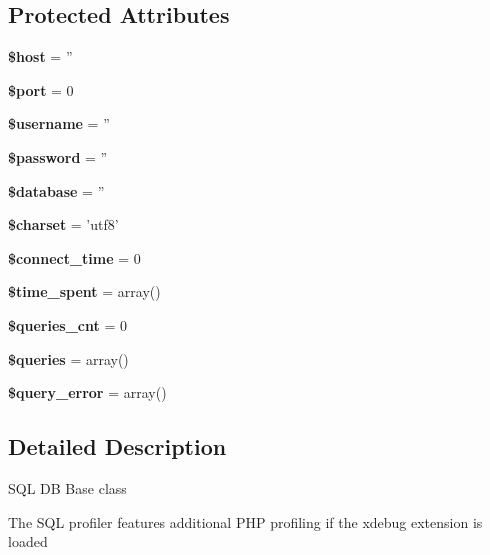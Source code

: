 \subsection*{Protected Attributes}
\begin{CompactItemize}
\item 
{\bf \$host} = ''\label{protocolDB__Base-p_ca95ca05d3a82d7cdfa7df3108f23173}

\item 
{\bf \$port} = 0\label{protocolDB__Base-p_230adeded1094a16331a2196dae7c0cb}

\item 
{\bf \$username} = ''\label{protocolDB__Base-p_a5eabff2dedadf9c88ba298817b31640}

\item 
{\bf \$password} = ''\label{protocolDB__Base-p_f5ac2728a90f6e1f674e1a709c8f1664}

\item 
{\bf \$database} = ''\label{protocolDB__Base-p_7c0d9694a598fbaf6b4786747a0430df}

\item 
{\bf \$charset} = 'utf8'\label{protocolDB__Base-p_c683f31c119eb65c10a62bbba3988599}

\item 
{\bf \$connect\_\-time} = 0\label{protocolDB__Base-p_1376bcb3582ad9d5a5c4b8c0073c0ae3}

\item 
{\bf \$time\_\-spent} = array()\label{protocolDB__Base-p_fb25facc5f6de7da3f7984c22ed0ee64}

\item 
{\bf \$queries\_\-cnt} = 0\label{protocolDB__Base-p_52ab253ae74762134c2c37e17a274c7d}

\item 
{\bf \$queries} = array()\label{protocolDB__Base-p_a37acf8e3d15c71d6c768b913d38f745}

\item 
{\bf \$query\_\-error} = array()\label{protocolDB__Base-p_62a33a7d59463f25b75c14df58564924}

\end{CompactItemize}


\subsection{Detailed Description}
SQL DB Base class

The SQL profiler features additional PHP profiling if the xdebug extension is loaded

